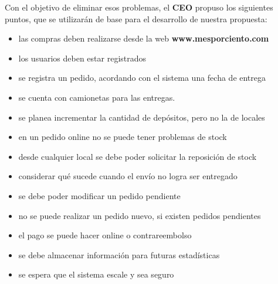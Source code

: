 Con el objetivo de eliminar esos problemas, el \textbf{CEO} propuso los
siguientes puntos, que se utilizarán de base para el desarrollo de nuestra
propuesta:
\begin{itemize}

  \item las compras deben realizarse desde la web \textbf{www.mesporciento.com}
  
  \item los usuarios deben estar registrados

  \item se registra un pedido, acordando con el sistema una fecha de entrega

  \item se cuenta con camionetas para las entregas.

  \item se planea incrementar la cantidad de depósitos, pero no la de locales

  \item en un pedido online no se puede tener problemas de stock

  \item desde cualquier local se debe poder solicitar la reposición de stock

  \item considerar qué sucede cuando el envío no logra ser entregado

  \item se debe poder modificar un pedido pendiente

  \item no se puede realizar un pedido nuevo, si existen pedidos pendientes

  \item el pago se puede hacer online o contrareembolso

  \item se debe almacenar información para futuras estadísticas

  \item se espera que el sistema escale y sea seguro

\end{itemize}